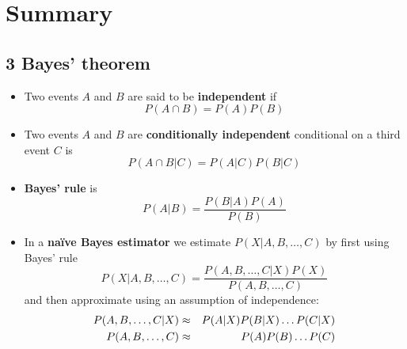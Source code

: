 
\ifind
\section*{Summary}
\else
\subsection*{3 Bayes' theorem}
\fi

\begin{itemize}
\item Two events $A$ and $B$ are said to be \textbf{independent} if 
\begin{equation}
P(A\cap B)=P(A)P(B)
\end{equation}
\item  Two events $A$ and $B$
are \textbf{conditionally independent} conditional on a third event
$C$ is
\begin{equation}
P(A\cap B|C)=P(A|C)P(B|C)
\end{equation}
\item \textbf{Bayes' rule} is
  \begin{equation}
    P(A|B)=\frac{P(B|A)P(A)}{P(B)}
\end{equation}
\item In a \textbf{na\"ive Bayes estimator} we estimate $P(X|A,B,\ldots,C)$ by first using Bayes' rule
  \begin{equation}
    P(X|A,B,\ldots,C)=\frac{P(A,B,\ldots,C|X)P(X)}{P(A,B,\ldots,C)}
  \end{equation}
  and then approximate using an assumption of independence:
  \begin{eqnarray}
    P(A,B,\ldots,C|X)&\approx&P(A|X)P(B|X)\ldots P(C|X)\cr
    P(A,B,\ldots,C)&\approx&P(A)P(B)\ldots P(C)
  \end{eqnarray}
\end{itemize}
